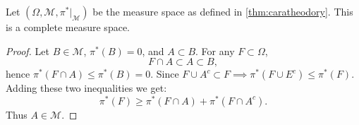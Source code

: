 \begin{proposition}
  Let $(\Omega, \mathscr{M}, \pi^*|_{ \mathscr{M}})$ be the measure space as defined in \cref{thm:caratheodory}. This is a complete measure space.
\end{proposition}
\begin{proof}
  Let $B\in \mathscr{M}$, $\pi^*(B) = 0$, and $A\subset B$. For any $F \subset \Omega$,
  \[F\cap A \subset A \subset B,\]
  hence $\pi^*(F\cap A) \leq \pi^*(B) = 0$. Since $F\cup A^c \subset F \implies \pi^*(F\cup E^c) \leq \pi^*(F)$. Adding these two inequalities we get:
  \[\pi^*(F) \geq \pi^*(F\cap A)+ \pi^*(F\cap A^c).\]
  Thus $A\in \mathscr{M}$.
\end{proof}
